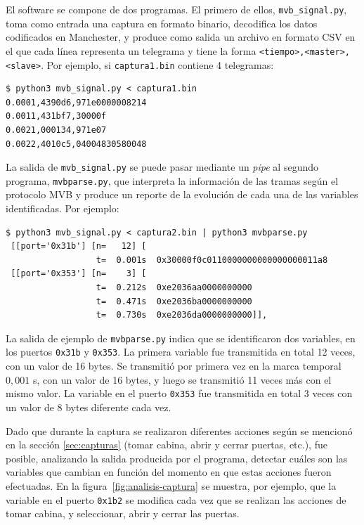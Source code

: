 El software se compone de dos programas. El primero de ellos, \texttt{mvb\_signal.py}, toma como entrada una captura en formato binario, decodifica los datos codificados en Manchester, y produce como salida un archivo en formato CSV en el que cada línea representa un telegrama y tiene la forma \texttt{<tiempo>,\allowbreak <master>,\allowbreak <slave>}. Por ejemplo, si \texttt{captura1.bin} contiene 4 telegramas:

\begin{lstlisting}[basicstyle=\footnotesize,breaklines=true,backgroundcolor=\color{light-gray}]
$ python3 mvb_signal.py < captura1.bin
0.0001,4390d6,971e0000008214
0.0011,431bf7,30000f
0.0021,000134,971e07
0.0022,4010c5,04004830580048
\end{lstlisting}

La salida de \texttt{mvb\_signal.py} se puede pasar mediante un \textit{pipe} al segundo programa, \texttt{mvbparse.py}, que interpreta la información de las tramas según el protocolo MVB y produce un reporte de la evolución de cada una de las variables identificadas. Por ejemplo:

\begin{lstlisting}[basicstyle=\footnotesize,breaklines=true,backgroundcolor=\color{light-gray}]
$ python3 mvb_signal.py < captura2.bin | python3 mvbparse.py
 [[port='0x31b'] [n=   12] [
                  t=  0.001s  0x30000f0c0110000000000000000011a8
 [[port='0x353'] [n=    3] [
                  t=  0.212s  0xe2036aa0000000000
                  t=  0.471s  0xe2036ba0000000000
                  t=  0.730s  0xe2036da0000000000]],
\end{lstlisting}

La salida de ejemplo de \texttt{mvbparse.py} indica que se identificaron dos variables, en los puertos \texttt{0x31b} y \texttt{0x353}.
La primera variable fue transmitida en total 12 veces, con un valor de 16 bytes. Se transmitió por primera vez en la marca temporal $0{,}001$ s, con un valor de 16 bytes, y luego se transmitió 11 veces más con el mismo valor.
La variable en el puerto \texttt{0x353} fue transmitida en total 3 veces con un valor de 8 bytes diferente cada vez.

Dado que durante la captura se realizaron diferentes acciones según se mencionó en la sección \ref{sec:capturas} (tomar cabina, abrir y cerrar puertas, etc.), fue posible, analizando la salida producida por el programa, detectar cuáles son las variables que cambian en función del momento en que estas acciones fueron efectuadas. En la figura~\ref{fig:analisis-captura} se muestra, por ejemplo, que la variable en el puerto \texttt{0x1b2} se modifica cada vez que se realizan las acciones de tomar cabina, y seleccionar, abrir y cerrar las puertas.

